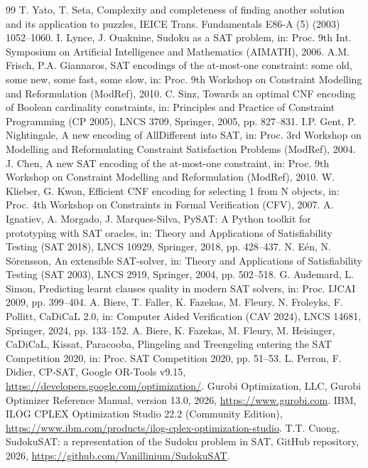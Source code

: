 \begin{thebibliography}{99}
\small
{} T. Yato, T. Seta, Complexity and completeness of finding another solution and its application to puzzles, IEICE Trans. Fundamentals E86-A (5) (2003) 1052--1060.
 I. Lynce, J. Ouaknine, Sudoku as a SAT problem, in: Proc. 9th Int. Symposium on Artificial Intelligence and Mathematics (AIMATH), 2006.
 A.M. Frisch, P.A. Giannaros, SAT encodings of the at-most-one constraint: some old, some new, some fast, some slow, in: Proc. 9th Workshop on Constraint Modelling and Reformulation (ModRef), 2010.
 C. Sinz, Towards an optimal CNF encoding of Boolean cardinality constraints, in: Principles and Practice of Constraint Programming (CP 2005), LNCS 3709, Springer, 2005, pp. 827--831.
 I.P. Gent, P. Nightingale, A new encoding of AllDifferent into SAT, in: Proc. 3rd Workshop on Modelling and Reformulating Constraint Satisfaction Problems (ModRef), 2004.
 J. Chen, A new SAT encoding of the at-most-one constraint, in: Proc. 9th Workshop on Constraint Modelling and Reformulation (ModRef), 2010.
 W. Klieber, G. Kwon, Efficient CNF encoding for selecting 1 from N objects, in: Proc. 4th Workshop on Constraints in Formal Verification (CFV), 2007.
 A. Ignatiev, A. Morgado, J. Marques-Silva, PySAT: A Python toolkit for prototyping with SAT oracles, in: Theory and Applications of Satisfiability Testing (SAT 2018), LNCS 10929, Springer, 2018, pp. 428--437.
 N. E\'en, N. S\"orensson, An extensible SAT-solver, in: Theory and Applications of Satisfiability Testing (SAT 2003), LNCS 2919, Springer, 2004, pp. 502--518.
 G. Audemard, L. Simon, Predicting learnt clauses quality in modern SAT solvers, in: Proc. IJCAI 2009, pp. 399--404.
 A. Biere, T. Faller, K. Fazekas, M. Fleury, N. Froleyks, F. Pollitt, CaDiCaL 2.0, in: Computer Aided Verification (CAV 2024), LNCS 14681, Springer, 2024, pp. 133--152.
 A. Biere, K. Fazekas, M. Fleury, M. Heisinger, CaDiCaL, Kissat, Paracooba, Plingeling and Treengeling entering the SAT Competition 2020, in: Proc. SAT Competition 2020, pp. 51--53.
 L. Perron, F. Didier, CP-SAT, Google OR-Tools v9.15, \url{https://developers.google.com/optimization/}.
 Gurobi Optimization, LLC, Gurobi Optimizer Reference Manual, version 13.0, 2026, \url{https://www.gurobi.com}.
 IBM, ILOG CPLEX Optimization Studio 22.2 (Community Edition), \url{https://www.ibm.com/products/ilog-cplex-optimization-studio}.
 T.T. Cuong, SudokuSAT: a representation of the Sudoku problem in SAT, GitHub repository, 2026, \url{https://github.com/Vanillinium/SudokuSAT}.
\end{thebibliography}
